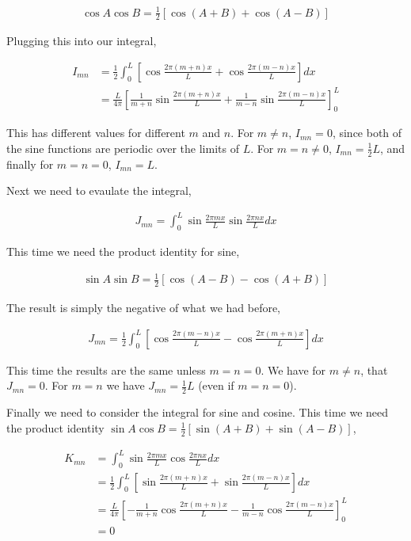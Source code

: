 \documentclass[11pt]{amsart}
\begin{document}
\begin{align*}
  \cos{A}\cos{B} = \frac{1}{2}\left[\cos(A+B)+\cos(A-B)\right]
\end{align*}

Plugging this into our integral,

\begin{align*}
  I_{mn} &= \frac{1}{2}\int_0^L\left[\cos{\frac{2\pi(m+n)x}{L}}+\cos{\frac{2\pi(m-n)x}{L}}\right] dx \\
         &= \frac{L}{4\pi}\left[\frac{1}{m+n}\sin{\frac{2\pi(m+n)x}{L}}+\frac{1}{m-n}\sin{\frac{2\pi(m-n)x}{L}}\right]_0^L
\end{align*}

This has different values for different $m$ and $n$. For $m \neq n$, $I_{mn} = 0$, since both of the sine functions are periodic over the limits of $L$. For $m = n \neq 0$, $I_{mn} = \frac{1}{2} L$, and finally for $m = n = 0$, $I_{mn} = L$.

Next we need to evaulate the integral,

\begin{align*}
  J_{mn} = \int_0^L \sin{\frac{2\pi mx}{L}} \sin{\frac{2\pi nx}{L}} dx
\end{align*}

This time we need the product identity for sine,

\begin{align*}
  \sin{A}\sin{B} = \frac{1}{2}\left[\cos(A-B)-\cos(A+B)\right]
\end{align*}

The result is simply the negative of what we had before,

\begin{align*}
  J_{mn} = \frac{1}{2}\int_0^L\left[\cos{\frac{2\pi(m-n)x}{L}}-\cos{\frac{2\pi(m+n)x}{L}}\right] dx
\end{align*}

This time the results are the same unless $m = n = 0$. We have for $m \neq n$, that $J_{mn} = 0$. For $m = n$ we have $J_{mn} = \frac{1}{2} L$ (even if $m = n = 0$).

Finally we need to consider the integral for sine and cosine. This time we need the product identity $\sin{A}\cos{B} = \frac{1}{2}\left[\sin(A+B)+\sin(A-B)\right]$,

\begin{align*}
  K_{mn} &= \int_0^L\sin{\frac{2\pi mx}{L}}\cos{\frac{2\pi nx}{L}} dx \\
         &= \frac{1}{2}\int_0^L\left[\sin{\frac{2\pi(m+n)x}{L}}+\sin{\frac{2\pi(m-n)x}{L}}\right] dx \\
         &= \frac{L}{4\pi}\left[-\frac{1}{m+n}\cos{\frac{2\pi(m+n)x}{L}}-\frac{1}{m-n}\cos{\frac{2\pi(m-n)x}{L}}\right]_0^L \\
         &= 0
\end{align*}
\end{document}
